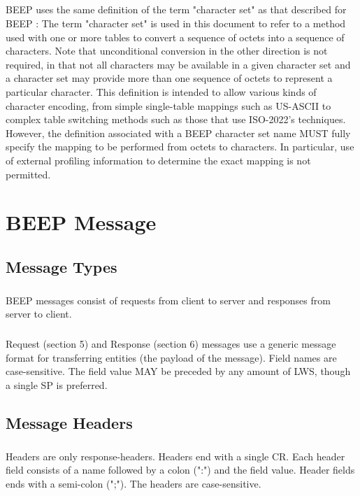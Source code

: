         \paragraph{}
BEEP uses the same definition of the term "character set" as that
described for BEEP :
The term "character set" is used in this document to refer to a
method used with one or more tables to convert a sequence of octets
into a sequence of characters. Note that unconditional conversion in
the other direction is not required, in that not all characters may
be available in a given character set and a character set may provide
more than one sequence of octets to represent a particular character.
This definition is intended to allow various kinds of character
encoding, from simple single-table mappings such as US-ASCII to
complex table switching methods such as those that use ISO-2022's
techniques. However, the definition associated with a BEEP character
set name MUST fully specify the mapping to be performed from octets
to characters. In particular, use of external profiling information
to determine the exact mapping is not permitted.


    \clearpage
\chapter{BEEP Message}
    \section{Message Types}
        \paragraph{}
BEEP messages consist of requests from client to server and responses
from server to client.
        \paragraph{}
Request (section 5) and Response (section 6) messages use a generic
message format for transferring entities (the payload of the
message). Field names are case-sensitive. The field value MAY be
preceded by any amount of LWS, though a single SP is preferred.

    \section{Message Headers}
        \paragraph{}
Headers are only response-headers. Headers end with a single CR.
Each header field consists of a name followed by a colon (":") and
the field value. Header fields ends with a semi-colon (";"). The
headers are case-sensitive.


